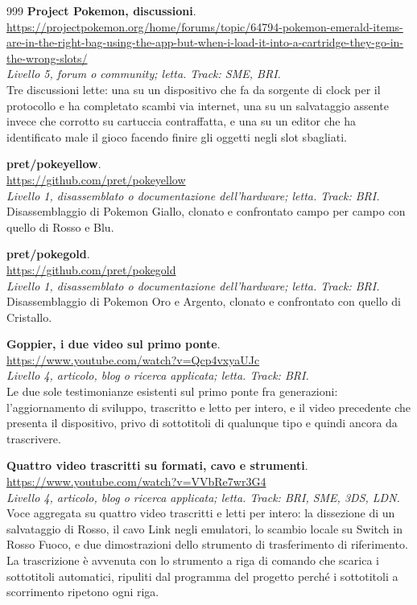 \begin{thebibliography}{999}
  \textbf{Project Pokemon, discussioni}.
  \\ \url{https://projectpokemon.org/home/forums/topic/64794-pokemon-emerald-items-are-in-the-right-bag-using-the-app-but-when-i-load-it-into-a-cartridge-they-go-in-the-wrong-slots/}
  \\ \emph{Livello 5, forum o community; letta. Track: SME, BRI.}
  \\ Tre discussioni lette: una su un dispositivo che fa da sorgente di clock per il protocollo e ha completato scambi via internet, una su un salvataggio assente invece che corrotto su cartuccia contraffatta, e una su un editor che ha identificato male il gioco facendo finire gli oggetti negli slot sbagliati.

  \textbf{pret/pokeyellow}.
  \\ \url{https://github.com/pret/pokeyellow}
  \\ \emph{Livello 1, disassemblato o documentazione dell'hardware; letta. Track: BRI.}
  \\ Disassemblaggio di Pokemon Giallo, clonato e confrontato campo per campo con quello di Rosso e Blu.

  \textbf{pret/pokegold}.
  \\ \url{https://github.com/pret/pokegold}
  \\ \emph{Livello 1, disassemblato o documentazione dell'hardware; letta. Track: BRI.}
  \\ Disassemblaggio di Pokemon Oro e Argento, clonato e confrontato con quello di Cristallo.

  \textbf{Goppier, i due video sul primo ponte}.
  \\ \url{https://www.youtube.com/watch?v=Qcp4vxyaUJc}
  \\ \emph{Livello 4, articolo, blog o ricerca applicata; letta. Track: BRI.}
  \\ Le due sole testimonianze esistenti sul primo ponte fra generazioni: l'aggiornamento di sviluppo, trascritto e letto per intero, e il video precedente che presenta il dispositivo, privo di sottotitoli di qualunque tipo e quindi ancora da trascrivere.

  \textbf{Quattro video trascritti su formati, cavo e strumenti}.
  \\ \url{https://www.youtube.com/watch?v=VVbRe7wr3G4}
  \\ \emph{Livello 4, articolo, blog o ricerca applicata; letta. Track: BRI, SME, 3DS, LDN.}
  \\ Voce aggregata su quattro video trascritti e letti per intero: la dissezione di un salvataggio di Rosso, il cavo Link negli emulatori, lo scambio locale su Switch in Rosso Fuoco, e due dimostrazioni dello strumento di trasferimento di riferimento. La trascrizione è avvenuta con lo strumento a riga di comando che scarica i sottotitoli automatici, ripuliti dal programma del progetto perché i sottotitoli a scorrimento ripetono ogni riga.


\end{thebibliography}
